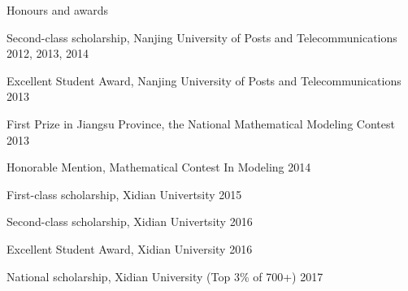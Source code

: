 \documentclass{resume} %
\begin{document}
\begin{rSection}{Honours and awards}
\begin{rSubsection}{}{}{}{}

\item Second-class scholarship, Nanjing University of Posts and Telecommunications \hfill {2012, 2013, 2014}
\item Excellent Student Award, Nanjing University of Posts and Telecommunications \hfill {2013}
\item First Prize in Jiangsu Province, the National Mathematical Modeling Contest \hfill {2013}
\item Honorable Mention, Mathematical Contest In Modeling \hfill {2014}
\item First-class scholarship, Xidian Univertsity \hfill {2015}
\item Second-class scholarship, Xidian Univertsity \hfill {2016}
\item Excellent Student Award, Xidian University \hfill {2016}
\item National scholarship, Xidian University (Top 3\% of 700+) \hfill {2017}
\end{rSubsection}

\end{rSection}


\end{document}
